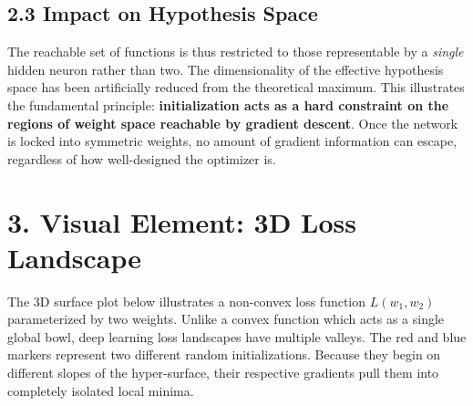 \documentclass[11pt,a4paper]{article}
\begin{document}
\subsection*{2.3 Impact on Hypothesis Space}
The reachable set of functions is thus restricted to those representable by a \emph{single} hidden neuron rather than two. The dimensionality of the effective hypothesis space has been artificially reduced from the theoretical maximum. This illustrates the fundamental principle: \textbf{initialization acts as a hard constraint on the regions of weight space reachable by gradient descent}. Once the network is locked into symmetric weights, no amount of gradient information can escape, regardless of how well-designed the optimizer is.

\section*{3. Visual Element: 3D Loss Landscape}
The 3D surface plot below illustrates a non-convex loss function $L(w_1, w_2)$ parameterized by two weights. Unlike a convex function which acts as a single global bowl, deep learning loss landscapes have multiple valleys. The red and blue markers represent two different random initializations. Because they begin on different slopes of the hyper-surface, their respective gradients pull them into completely isolated local minima.
\end{document}
